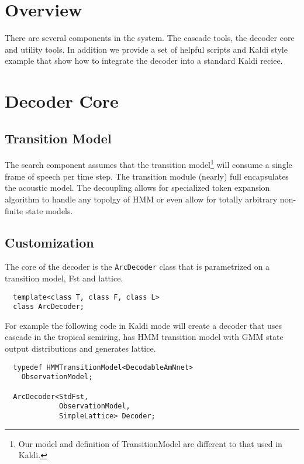 \documentclass{article}
\begin{document}
\section{Overview}
\label{sec:format}
There are several components in the system. The cascade tools, the decoder core
and utility tools. In addition we provide a set of helpful scripts and Kaldi style
example that show how to integrate the decoder into a standard Kaldi reciee.

\section{Decoder Core}
\label{sec:decodercore}

\subsection{Transition Model}
The search component assumes that the transition model\footnote{Our model and definition of TransitionModel
are different to that used in Kaldi.} will consume a single
frame of speech per time step. The transition module (nearly) full encapsulates
the acoustic model. The decoupling allows for specialized token expansion algorithm
to handle any topolgy of HMM or even allow for totally arbitrary non-finite state
models. 



\subsection{Customization}
\label{sec:custom}
The core of the decoder is the \texttt{ArcDecoder} class that is parametrized on a transition
model, Fst  and lattice.
\begin{verbatim}
  template<class T, class F, class L>
  class ArcDecoder;
\end{verbatim}

For example the following code in Kaldi mode will create a decoder that uses
cascade in the tropical semiring, has HMM transition model with GMM state 
output distributions and generates lattice.

\begin{verbatim}
  typedef HMMTransitionModel<DecodableAmNnet> 
    ObservationModel;

  ArcDecoder<StdFst,         
             ObservationModel,
             SimpleLattice> Decoder;
\end{verbatim}
\end{document}
